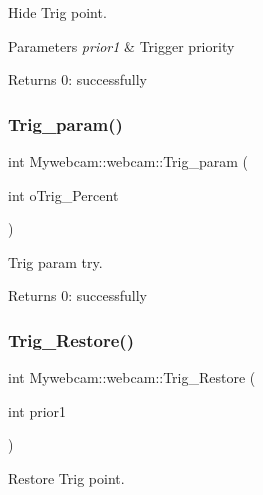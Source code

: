 Hide Trig point. 


\begin{DoxyParams}{Parameters}
{\em prior1} & Trigger priority \\
\hline
\end{DoxyParams}
\begin{DoxyReturn}{Returns}
0\+: successfully 
\end{DoxyReturn}
\mbox{\label{class_mywebcam_1_1webcam_a7e205a9aa849cab1cb47513cdd46a02b}} 
\subsubsection{\texorpdfstring{Trig\+\_\+param()}{Trig\_param()}}
{\footnotesize\ttfamily int Mywebcam\+::webcam\+::\+Trig\+\_\+param (\begin{DoxyParamCaption}\item[{int}]{o\+Trig\+\_\+\+Percent }\end{DoxyParamCaption})\hspace{0.3cm}{\ttfamily [inline]}}



Trig param try. 

\begin{DoxyReturn}{Returns}
0\+: successfully 
\end{DoxyReturn}
\mbox{\label{class_mywebcam_1_1webcam_a64f03adb86a05d550cf238c8beb22b1e}} 
\subsubsection{\texorpdfstring{Trig\+\_\+\+Restore()}{Trig\_Restore()}}
{\footnotesize\ttfamily int Mywebcam\+::webcam\+::\+Trig\+\_\+\+Restore (\begin{DoxyParamCaption}\item[{int}]{prior1 }\end{DoxyParamCaption})\hspace{0.3cm}{\ttfamily [inline]}}



Restore Trig point. 


